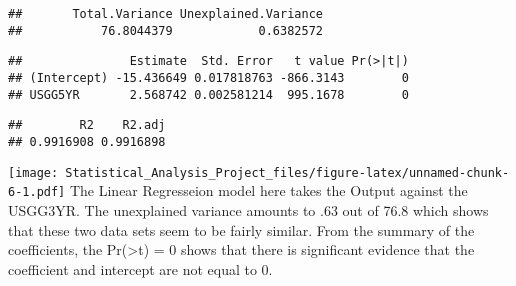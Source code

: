 \documentclass[]{article}
\newenvironment{Shaded}{\begin{snugshade}}{\end{snugshade}}
\newcommand{\KeywordTok}[1]{\textcolor[rgb]{0.13,0.29,0.53}{\textbf{#1}}}
\newcommand{\DataTypeTok}[1]{\textcolor[rgb]{0.13,0.29,0.53}{#1}}
\newcommand{\DecValTok}[1]{\textcolor[rgb]{0.00,0.00,0.81}{#1}}
\newcommand{\StringTok}[1]{\textcolor[rgb]{0.31,0.60,0.02}{#1}}
\newcommand{\OperatorTok}[1]{\textcolor[rgb]{0.81,0.36,0.00}{\textbf{#1}}}
\newcommand{\NormalTok}[1]{#1}
\begin{document}
\begin{verbatim}
##       Total.Variance Unexplained.Variance 
##           76.8044379            0.6382572
\end{verbatim}

\begin{Shaded}
\end{Shaded}

\begin{verbatim}
##               Estimate  Std. Error   t value Pr(>|t|)
## (Intercept) -15.436649 0.017818763 -866.3143        0
## USGG5YR       2.568742 0.002581214  995.1678        0
\end{verbatim}

\begin{Shaded}
\end{Shaded}

\begin{verbatim}
##        R2    R2.adj 
## 0.9916908 0.9916898
\end{verbatim}

\begin{Shaded}
\end{Shaded}

\texttt{[image: Statistical\_Analysis\_Project\_files/figure-latex/unnamed-chunk-6-1.pdf]}
The Linear Regresseion model here takes the Output against the USGG3YR.
The unexplained variance amounts to .63 out of 76.8 which shows that
these two data sets seem to be fairly similar. From the summary of the
coefficients, the Pr(\textgreater{}t) = 0 shows that there is
significant evidence that the coefficient and intercept are not equal to
0.
\end{document}
